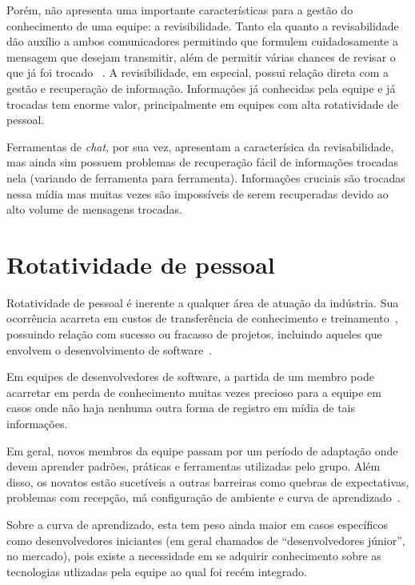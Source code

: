 Porém, não apresenta uma importante características para a gestão do conhecimento de uma equipe: a revisibilidade. Tanto ela quanto a revisabilidade dão auxílio a ambos comunicadores permitindo que formulem cuidadosamente a mensagem que desejam transmitir, além de permitir várias chances de revisar o que já foi trocado ~\cite{Olson2000}. A revisibilidade, em especial, possui relação direta com a gestão e recuperação de informação. Informações já conhecidas pela equipe e já trocadas tem enorme valor, principalmente em equipes com alta rotatividade de pessoal.

Ferramentas de \textit{chat}, por sua vez, apresentam a caracterísica da revisabilidade, mas ainda sim possuem problemas de recuperação fácil de informações trocadas nela (variando de ferramenta para ferramenta). Informações cruciais são trocadas nessa mídia mas muitas vezes são impossíveis de serem recuperadas devido ao alto volume de mensagens trocadas.

\section{Rotatividade de pessoal}

Rotatividade de pessoal é inerente a qualquer área de atuação da indústria.
Sua ocorrência acarreta em custos de transferência de conhecimento e treinamento~\cite{Hall2008}, possuindo relação com sucesso ou fracasso de projetos, incluindo aqueles que envolvem o desenvolvimento de software~\cite{Hall2008}.

Em equipes de desenvolvedores de software, a partida de um membro pode acarretar em perda de conhecimento muitas vezes precioso para a equipe em casos onde não haja nenhuma outra forma de registro em mídia de tais informações.

Em geral, novos membros da equipe passam por um período de adaptação onde devem aprender padrões, práticas e ferramentas utilizadas pelo grupo. Além disso, os novatos estão sucetíveis a outras barreiras como quebras de expectativas, problemas com recepção, má configuração de ambiente e curva de aprendizado~\cite{Steinmacher2015}.

Sobre a curva de aprendizado, esta tem peso ainda maior em casos específicos como desenvolvedores iniciantes (em geral chamados de ``desenvolvedores júnior'', no mercado), pois existe a necessidade em se adquirir conhecimento sobre as tecnologias utlizadas pela equipe ao qual foi recém integrado.

